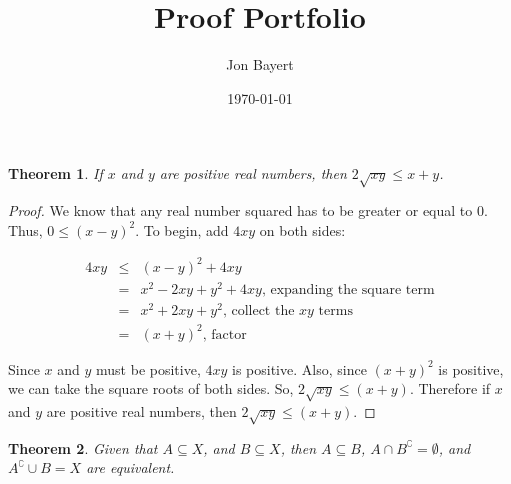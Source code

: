 \documentclass{article}
\title{Proof Portfolio}
\author{Jon Bayert}
\date{\today}
\newtheorem{theorem}{Theorem}
\begin{document}
\maketitle
\begin{theorem}
  If $x$ and $y$ are positive real numbers, then $2\sqrt{xy}\leq x+y$.
\end{theorem}
    
\begin{proof}
    We know that any real number squared has to be greater or equal to 0. Thus, $0 \leq (x-y)^2 $. To begin, add $4xy$ on both sides:
    
    \begin{eqnarray*}
    4xy &\leq& (x-y)^2 +4xy\\
     &=& x^2 - 2xy +y^2 +4xy\text{, expanding the square term}\\
     &=&  x^2 + 2xy +y^2\text{, collect the $xy$ terms}\\
     &=&  (x + y)^2\text{, factor}
    \end{eqnarray*}

    Since $x$ and $y$ must be positive, $4xy$ is positive. Also, since $(x+y)^2$ is positive, we can take the square roots of both sides. So, $ 2\sqrt{xy} \leq (x+y)$. Therefore if $x$ and $y$ are positive real numbers, then   $ 2\sqrt{xy} \leq (x+y)$.
    
\end{proof}
\pagebreak

\begin{theorem}
      Given that $A \subseteq X$, and $B \subseteq X$, then $A \subseteq B$, $A \cap B^\complement = \emptyset$, and $A^\complement \cup B = X$ are equivalent.
\end{theorem}
\end{document}

